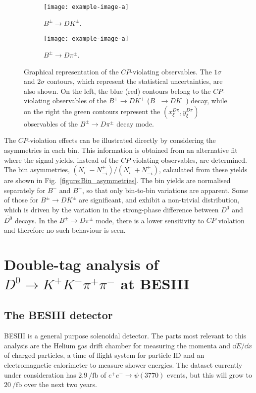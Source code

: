 \documentclass[12pt, a4paper, notitlepage, onecolumn]{article}
\begin{document}
\begin{figure}[tb]
    \centering
    \begin{subfigure}{0.5\textwidth}
        \texttt{[image: example-image-a]}
        \caption{$B^\pm\to DK^\pm$.}
        \label{figure:CP_observables_DK}
    \end{subfigure}%
    \begin{subfigure}{0.5\textwidth}
        \texttt{[image: example-image-a]}
        \caption{$B^\pm\to D\pi^\pm$.}
        \label{figure:CP_observables_Dpi}
    \end{subfigure}
    \caption{Graphical representation of the $C\!P$-violating observables. The $1\sigma$ and $2\sigma$ contours, which represent the statistical uncertainties, are also shown. On the left, the blue (red) contours belong to the $C\!P$-violating observables of the $B^+\to DK^+$ ($B^-\to DK^-$) decay, while on the right the green contours represent the $(x_\xi^{D\pi}, y_\xi^{D\pi})$ observables of the $B^\pm\to D\pi^\pm$ decay mode.}
    \label{figure:CP_observables}
\end{figure}

The $C\!P$-violation effects can be illustrated directly by considering the asymmetries in each bin. This information is obtained from an alternative fit where the signal yields, instead of the $C\!P$-violating observables, are determined. The bin asymmetries, $(N_i^- - N_{-i}^+)/(N_i^- + N_{-i}^+)$, calculated from these yields are shown in Fig.~\ref{figure:Bin_asymmetries}. The bin yields are normalised separately for $B^-$ and $B^+$, so that only bin-to-bin variations are apparent. Some of those for $B^\pm\to DK^\pm$ are significant, and exhibit a non-trivial distribution, which is driven by the variation in the strong-phase difference between $D^0$ and $\bar{D^0}$ decays. In the $B^\pm\to D\pi^\pm$ mode, there is a lower sensitivity to $C\!P$ violation and therefore no such behaviour is seen.

\section{Double-tag analysis of $D^0\to K^+K^-\pi^+\pi^-$ at BESIII}
\subsection{The BESIII detector}
\noindent BESIII \cite{cite_BESIII} is a general purpose solenoidal detector. The parts most relevant to this analysis are the Helium gas drift chamber for measuring the momenta and $\dd{E}/\dd{x}$ of charged particles, a time of flight system for particle ID and an electromagnetic calorimeter to measure shower energies. The dataset currently under consideration has $\SI{2.9}{\per\femto\barn}$ of $e^+e^-\to\psi(3770)$ events, but this will grow to $\SI{20}{\per\femto\barn}$ over the next two years.
\end{document}
